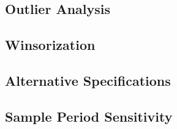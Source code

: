 
\subsection{Outlier Analysis}

\subsection{Winsorization}

\subsection{Alternative Specifications}

\subsection{Sample Period Sensitivity}

